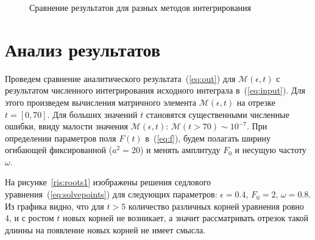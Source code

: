 \documentclass[14pt, a4paper]{article}
\numberwithin{figure}{section}
\numberwithin{equation}{section}
\newcommand{\sectionbreak}{\clearpage}
\newcommand{\cM}{\mathcal{M}}
\begin{document}
\begin{figure}[h]
	\caption{Сравнение результатов для разных методов интегрирования}
	\label{ris:fftw_compare_no_fftw2}
\end{figure}


\sectionbreak
\section{Анализ результатов}

Проведем сравнение аналитического результата~(\ref{eq:out}) для $\cM(\epsilon,t)$ с результатом численного интегрирования исходного интеграла в~(\ref{eq:input}). Для этого произведем вычисления матричного элемента $\cM(\epsilon,t)$ на отрезке $t = [0, 70]$. 
Для больших значений $t$ становятся существенными численные ошибки, ввиду малости значения $\cM(\epsilon,t)$: $\cM(t>70)\sim 10^{-7}$.
При определении параметров поля $F(t)$ в~(\ref{eq:f}), будем полагать ширину огибающей фиксированной ($a^2=20$) и менять амплитуду $F_0$ и несущую частоту $\omega$. 

На рисунке~\ref{ris:roots1} изображены решения седлового уравнения~(\ref{eq:solvepoints}) для следующих параметров:
$\epsilon = 0.4$, $F_0 = 2$, $\omega = 0.8$.
Из графика видно, что для $t>5$ количество различных корней уравнения ровно 4, и с ростом $t$ новых корней не возникает, а значит рассматривать отрезок такой длинны на появление новых корней не имеет смысла.
\end{document}
